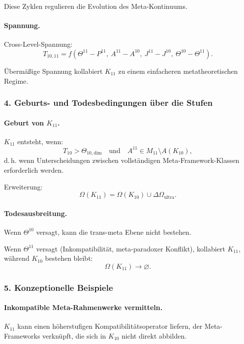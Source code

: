 Diese Zyklen regulieren die Evolution des Meta-Kontinuums.

\paragraph{Spannung.}
Cross-Level-Spannung:
\[
T_{10,11} =
f(\Theta^{11} - P^{11},\ A^{11} - A^{10},\
  J^{11} - J^{10},\ \Theta^{10} - \Theta^{11}).
\]

Übermäßige Spannung kollabiert $K_{11}$ zu einem einfacheren metatheoretischen
Regime.

\subsubsection{4. Geburts- und Todesbedingungen über die Stufen}

\paragraph{Geburt von $K_{11}$.}
$K_{11}$ entsteht, wenn:
\[
T_{10} > \Theta_{10,\mathrm{dim}}
\quad\text{und}\quad
A^{11} \in M_{11} \setminus A(K_{10}),
\]
d.\,h. wenn Unterscheidungen zwischen vollständigen Meta-Framework-Klassen
erforderlich werden.

Erweiterung:
\[
\Omega(K_{11}) = \Omega(K_{10}) \cup \Delta\Omega_{\mathrm{ultra}}.
\]

\paragraph{Todesausbreitung.}
Wenn $\Theta^{10}$ versagt, kann die trans-meta Ebene nicht bestehen.

Wenn $\Theta^{11}$ versagt (Inkompatibilität, meta-paradoxer Konflikt), kollabiert
$K_{11}$, während $K_{10}$ bestehen bleibt:
\[
\Omega(K_{11}) \rightarrow \varnothing.
\]

\subsubsection{5. Konzeptionelle Beispiele}

\paragraph{Inkompatible Meta-Rahmenwerke vermitteln.}
$K_{11}$ kann einen höherstufigen Kompatibilitätsoperator liefern, der
Meta-Frameworks verknüpft, die sich in $K_{10}$ nicht direkt abbilden.

